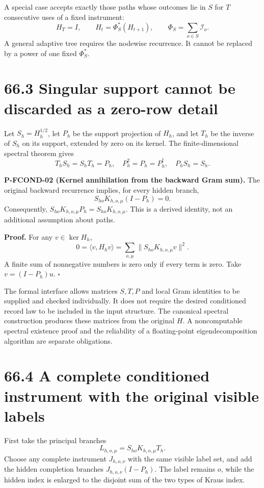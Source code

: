 \documentclass[
  11pt,
  oneside]{book}
\begin{document}
A special case accepts exactly those paths whose outcomes lie in \(S\)
for \(T\) consecutive uses of a fixed instrument: \[
H_T=I,\qquad H_t=\Phi_S^*(H_{t+1}),\qquad
\Phi_S=\sum_{o\in S}\mathcal I_o.
\] A general adaptive tree requires the nodewise recurrence. It cannot
be replaced by a power of one fixed \(\Phi_S^*\).

\section{66.3 Singular support cannot be discarded as a zero-row detail}

Let \(S_h=H_h^{1/2}\), let \(P_h\) be the support projection of \(H_h\),
and let \(T_h\) be the inverse of \(S_h\) on its support, extended by
zero on its kernel. The finite-dimensional spectral theorem gives \[
T_hS_h=S_hT_h=P_h,\quad P_h^2=P_h=P_h^{\dagger},\quad P_hS_h=S_h.
\]

\label{p-fcond-02}{} \textbf{P-FCOND-02 (Kernel
annihilation from the backward Gram sum).} The original backward
recurrence implies, for every hidden branch, \[
S_{ho}K_{h,o,\mu}(I-P_h)=0.
\] Consequently, \(S_{ho}K_{h,o,\mu}P_h=S_{ho}K_{h,o,\mu}\). This is a
derived identity, not an additional assumption about paths.

\textbf{Proof.} For any \(v\in\ker H_h\), \[
0=\langle v,H_hv\rangle
=\sum_{o,\mu}\|S_{ho}K_{h,o,\mu}v\|^2.
\] A finite sum of nonnegative numbers is zero only if every term is
zero. Take \(v=(I-P_h)u\). \(\square\)

The formal interface allows matrices \(S,T,P\) and local Gram identities
to be supplied and checked individually. It does not require the desired
conditioned record law to be included in the input structure. The
canonical spectral construction produces these matrices from the
original \(H\). A noncomputable spectral existence proof and the
reliability of a floating-point eigendecomposition algorithm are
separate obligations.

\section{66.4 A complete conditioned instrument with the original
visible labels}

First take the principal branches \[
L_{h,o,\mu}=S_{ho}K_{h,o,\mu}T_h.
\] Choose any complete instrument \(J_{h,o,\nu}\) with the same visible
label set, and add the hidden completion branches
\(J_{h,o,\nu}(I-P_h)\). The label remains \(o\), while the hidden index
is enlarged to the disjoint sum of the two types of Kraus index.
\end{document}
